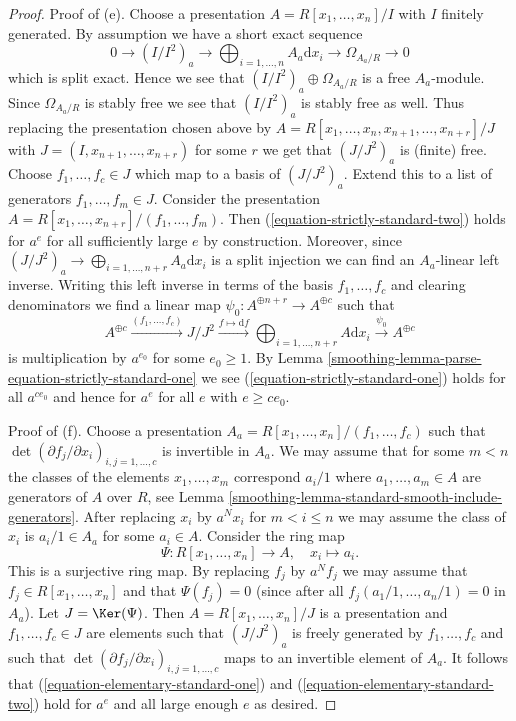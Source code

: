 \begin{proof}
\medskip\noindent
Proof of (e). Choose a presentation
$A = R[x_1, \ldots, x_n]/I$ with $I$ finitely generated.
By assumption we have a short exact sequence
$$
0 \to (I/I^2)_a \to \bigoplus\nolimits_{i = 1, \ldots, n} A_a\text{d}x_i \to
\Omega_{A_a/R} \to 0
$$
which is split exact. Hence we see that
$(I/I^2)_a \oplus \Omega_{A_a/R}$ is a free $A_a$-module.
Since $\Omega_{A_a/R}$ is stably free we see that $(I/I^2)_a$
is stably free as well. Thus replacing the presentation chosen
above by $A = R[x_1, \ldots, x_n, x_{n + 1}, \ldots, x_{n + r}]/J$ with
$J = (I, x_{n + 1}, \ldots, x_{n + r})$ for some $r$ we get that $(J/J^2)_a$
is (finite) free. Choose $f_1, \ldots, f_c \in J$ which map to a basis of
$(J/J^2)_a$. Extend this to a list of generators
$f_1, \ldots, f_m \in J$. Consider the presentation
$A = R[x_1, \ldots, x_{n + r}]/(f_1, \ldots, f_m)$.
Then (\ref{equation-strictly-standard-two}) holds for $a^e$
for all sufficiently large $e$ by construction. Moreover, since
$(J/J^2)_a \to \bigoplus\nolimits_{i = 1, \ldots, n + r} A_a\text{d}x_i$
is a split injection we can find an $A_a$-linear left inverse.
Writing this left inverse in terms of the basis $f_1, \ldots, f_c$
and clearing denominators we find a linear map
$\psi_0 : A^{\oplus n + r} \to A^{\oplus c}$ such that
$$
A^{\oplus c} \xrightarrow{(f_1, \ldots, f_c)}
J/J^2 \xrightarrow{f \mapsto \text{d}f}
\bigoplus\nolimits_{i = 1, \ldots, n + r} A \text{d}x_i
\xrightarrow{\psi_0}
A^{\oplus c}
$$
is multiplication by $a^{e_0}$ for some $e_0 \geq 1$. By
Lemma \ref{smoothing-lemma-parse-equation-strictly-standard-one}
we see (\ref{equation-strictly-standard-one})
holds for all $a^{ce_0}$ and hence for $a^e$ for all $e$ with $e \geq ce_0$.

\medskip\noindent
Proof of (f). Choose a presentation
$A_a = R[x_1, \ldots, x_n]/(f_1, \ldots, f_c)$ such that
$\det(\partial f_j/\partial x_i)_{i, j = 1, \ldots, c}$
is invertible in $A_a$. We may assume that for some
$m < n$ the classes of the elements $x_1, \ldots, x_m$
correspond $a_i/1$ where $a_1, \ldots, a_m \in A$ are generators of $A$
over $R$, see Lemma \ref{smoothing-lemma-standard-smooth-include-generators}.
After replacing $x_i$ by $a^Nx_i$ for $m < i \leq n$
we may assume the class of $x_i$ is $a_i/1 \in A_a$ for some
$a_i \in A$. Consider the ring map
$$
\Psi : R[x_1, \ldots, x_n] \longrightarrow A,\quad
x_i \longmapsto a_i.
$$
This is a surjective ring map. By replacing $f_j$ by $a^Nf_j$ we may
assume that $f_j \in R[x_1, \ldots, x_n]$ and that
$\Psi(f_j) = 0$ (since after all $f_j(a_1/1, \ldots, a_n/1) = 0$
in $A_a$). Let $J = \Ker(\Psi)$. Then $A = R[x_1, \ldots, x_n]/J$
is a presentation and $f_1, \ldots, f_c \in J$ are elements such that
$(J/J^2)_a$ is freely generated by $f_1, \ldots, f_c$ and such
that $\det(\partial f_j/\partial x_i)_{i, j = 1, \ldots, c}$
maps to an invertible element of $A_a$. It follows that
(\ref{equation-elementary-standard-one}) and
(\ref{equation-elementary-standard-two})
hold for $a^e$ and all large enough $e$ as desired.
\end{proof}

